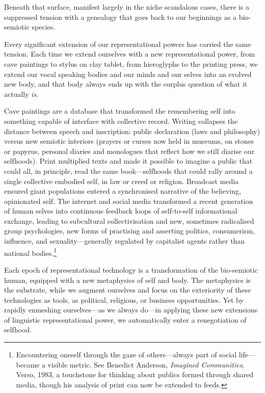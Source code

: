 Beneath that surface, manifest largely in the niche scandalous cases, there is a suppressed tension with a genealogy that goes back to our beginnings as a bio-semiotic species.

Every significant extension of our representational powers has carried the same tension. Each time we extend ourselves with a new representational power, from cave paintings to stylus on clay tablet, from hieroglyphs to the printing press, we extend our vocal speaking bodies and our minds and our selves into an evolved new body, and that body always ends up with the surplus question of what it actually \textit{is}.

Cave paintings are a database that transformed the remembering self into something capable of interface with collective record. Writing collapses the distance between speech and inscription: public declaration (laws and philosophy) versus new semiotic interiors (prayers or curses now held in museums, on stones or papyrus, personal diaries and monologues that reflect how we still diarise our selfhoods). Print multiplied texts and made it possible to imagine a public that could all, in principle, read the same book---selfhoods that could rally around a single collective embodied self, in law or creed or religion. Broadcast media ensured giant populations entered a synchronised narrative of the believing, opinionated self. The internet and social media transformed a recent generation of human selves into continuous feedback loops of self-to-self informational exchange, leading to subcultural collectivisation and new, sometimes radicalised group psychologies, new forms of practising and asserting politics, consumerism, influence, and sexuality---generally regulated by capitalist agents rather than national bodies.\footnote{Encountering oneself through the gaze of others---always part of social life---became a visible metric. See Benedict Anderson, \emph{Imagined Communities}, Verso, 1983, a touchstone for thinking about publics formed through shared media, though his analysis of print can now be extended to feeds.}

Each epoch of representational technology is a transformation of the bio-semiotic human, equipped with a new metaphysics of self and body. The metaphysics is the substrate, while we augment ourselves and focus on the exteriority of these technologies as tools, as political, religious, or business opportunities. Yet by rapidly enmeshing ourselves---as we always do---in applying these new extensions of linguistic representational power, we automatically enter a renegotiation of selfhood.

